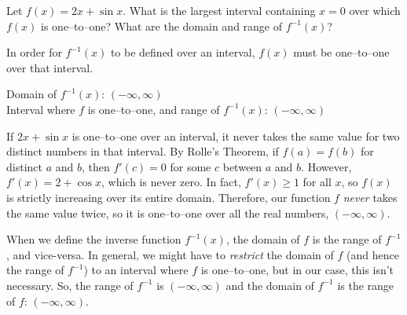 \begin{Mquestion}
Let $f(x)=2x+\sin x$. What is the largest interval containing $x=0$ over which  $f(x)$ is one--to--one?  What are the domain and range of $f^{-1}(x)$?
\end{Mquestion}
\begin{hint}
In order for $f^{-1}(x)$ to be defined over an interval, $f(x)$ must be one--to--one over that interval.
\end{hint}
\begin{answer}
Domain of $f^{-1}(x)$: $(-\infty,\infty)$\\
Interval where $f$ is one--to--one, and range of $f^{-1}(x)$: $(-\infty,\infty)$
\end{answer}
\begin{solution}
If $2x+\sin x$ is one--to--one over an interval, it never takes the same value for two distinct numbers in that interval. By Rolle's Theorem, if $f(a)=f(b)$ for distinct $a$ and $b$, then
$f'(c)=0$ for some $c$ between $a$ and $b$. However, $f'(x)=2+\cos x$, which is never zero. In fact, $f'(x)\ge 1$ for all $x$, so $f(x)$ is strictly increasing over its entire domain. Therefore, our function $f$ \emph{never} takes the same value twice, so it is one--to--one over all the real numbers, $(-\infty,\infty)$.

When we define the inverse function $f^{-1}(x)$, the domain of $f$ is the range of $f^{-1}$, and vice-versa. In general, we might have to \emph{restrict} the domain of $f$ (and hence the range of $f^{-1}$) to an interval where $f$ is one--to--one, but in our case, this isn't necessary. So, the range of $f^{-1}$ is $(-\infty,\infty)$ and the domain of $f^{-1}$ is the range of $f$: $(-\infty,\infty)$.
\end{solution}



